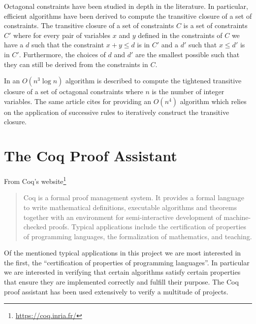 Octagonal constraints have been studied in depth in the literature. In particular, efficient
algorithms have been derived to compute the transitive closure of a set of constraints. The
transitive closure of a set of constraints $C$ is a set of constraints $C'$ where for every
pair of variables $x$ and $y$ defined in the constraints of $C$ we have a $d$ such that
the constraint $x + y \le d$ is in $C'$ and a $d'$ such that $x \le d'$ is in $C'$. Furthermore,
the choices of $d$ and $d'$ are the smallest possible such that they can still be derived from
the constraints in $C$.

In \cite{TransitiveClosure} an $O(n^3\log{n})$ algorithm is described to compute the tightened 
transitive closure of a set of octagonal constraints where $n$ is the number of integer variables. The 
same article cites \cite{HarveyStuckey} for providing an $O(n^4)$ algorithm which relies on the 
application of successive rules to iteratively construct the transitive closure.

\section{The Coq Proof Assistant}
\label{cap:coq-proof-assistant}

From Coq's website\footnote{\url{https://coq.inria.fr/}}

\begin{quote}
    Coq is a formal proof management system. It provides a formal language to write mathematical
    definitions, executable algorithms and theorems together with an environment for semi-interactive
    development of machine-checked proofs. Typical applications include the certification of properties
    of programming languages, the formalization of mathematics, and teaching.
\end{quote}

Of the mentioned typical applications in this project we are most interested in 
the first, the ``certification of properties of programming languages''. In
particular we are interested in verifying that certain algorithms satisfy certain properties
that ensure they are implemented correctly and fulfill their purpose. The Coq proof assistant 
has been used extensively to verify a multitude of projects.

